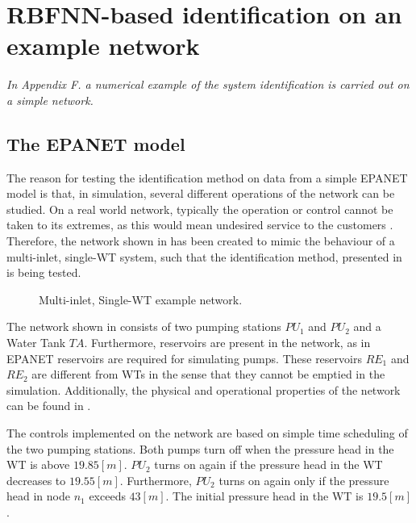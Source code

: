 \chapter{RBFNN-based identification on an example network}
\label{NN_based_example}

\emph{In Appendix F. a numerical example of the system identification is carried out on a simple network.}

\section{The EPANET model}
\label{example1_EPANET}

The reason for testing the identification method on data from a simple EPANET model is that, in simulation, several different operations of the network can be studied. On a real world network, typically the operation or control cannot be taken to its extremes, as this would mean undesired service to the customers . Therefore, the network shown in  has been created to mimic the behaviour of a multi-inlet, single-WT system, such that the identification method, presented in  is being tested. 

\begin{figure}[H]
\centering
 
\caption{Multi-inlet, Single-WT example network.}
\label{fig:epanet_example1_id}
\end{figure}
\vspace{-3mm}

The network shown in  consists of two pumping stations $PU_1$ and $PU_2$ and a Water Tank $TA$. Furthermore, reservoirs are present in the network, as in EPANET reservoirs are required for simulating pumps. These reservoirs $RE_1$ and $RE_2$ are different from WTs in the sense that they cannot be emptied in the simulation. Additionally, the physical and operational properties of the network can be found in . 

The controls implemented on the network are based on simple time scheduling of the two pumping stations. Both pumps turn off when the pressure head in the WT is above $19.85 [m]$. $PU_2$ turns on again if the pressure head in the WT decreases to $19.55 [m]$. Furthermore, $PU_2$ turns on again only if the pressure head in node $n_1$ exceeds $43 [m]$. The initial pressure head in the WT is $19.5 [m]$.

